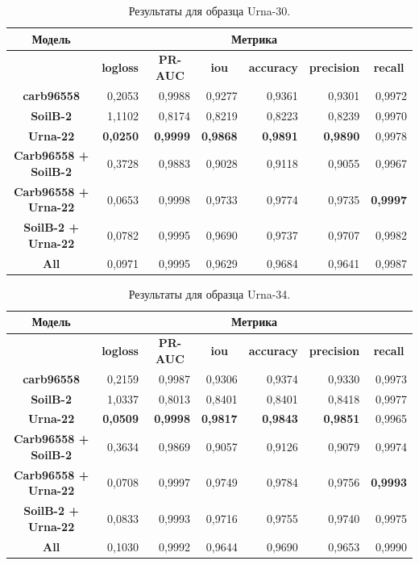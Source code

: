 \documentclass[12pt, a4paper]{extarticle}
\begin{document}
\begin{table}[htbp]
\small
\begin{tabular}{|c|r|r|r|r|r|r|}
\hline
\textbf{Модель} & \multicolumn{ 6}{c|}{\textbf{Метрика}} \\ \hline
\textbf{} & \multicolumn{1}{c|}{\textbf{logloss}} & \multicolumn{1}{c|}{\textbf{PR-AUC}} & \multicolumn{1}{c|}{\textbf{iou}} & \multicolumn{1}{c|}{\textbf{accuracy}} & \multicolumn{1}{c|}{\textbf{precision}} & \multicolumn{1}{c|}{\textbf{recall}} \\ \hline
\textbf{carb96558} & 0,2053 & 0,9988 & 0,9277 & 0,9361 & 0,9301 & 0,9972 \\ \hline
\textbf{SoilB-2} & 1,1102 & 0,8174 & 0,8219 & 0,8223 & 0,8239 & 0,9970 \\ \hline
\textbf{Urna-22} & \textbf{0,0250} & \textbf{0,9999} & \textbf{0,9868} & \textbf{0,9891} & \textbf{0,9890} & 0,9978 \\ \hline
\textbf{Carb96558 + SoilB-2} & 0,3728 & 0,9883 & 0,9028 & 0,9118 & 0,9055 & 0,9967 \\ \hline
\textbf{Carb96558 + Urna-22} & 0,0653 & 0,9998 & 0,9733 & 0,9774 & 0,9735 & \textbf{0,9997} \\ \hline
\textbf{SoilB-2 + Urna-22} & 0,0782 & 0,9995 & 0,9690 & 0,9737 & 0,9707 & 0,9982 \\ \hline
\textbf{All} & 0,0971 & 0,9995 & 0,9629 & 0,9684 & 0,9641 & 0,9987 \\ \hline
\end{tabular}
\caption{Результаты для образца Urna-30.}
\label{Urna_30}
\end{table}


\begin{table}[htbp]
\small
\begin{tabular}{|c|r|r|r|r|r|r|}
\hline
\textbf{Модель} & \multicolumn{ 6}{c|}{\textbf{Метрика}} \\ \hline
\textbf{} & \multicolumn{1}{c|}{\textbf{logloss}} & \multicolumn{1}{c|}{\textbf{PR-AUC}} & \multicolumn{1}{c|}{\textbf{iou}} & \multicolumn{1}{c|}{\textbf{accuracy}} & \multicolumn{1}{c|}{\textbf{precision}} & \multicolumn{1}{c|}{\textbf{recall}} \\ \hline
\textbf{carb96558} & 0,2159 & 0,9987 & 0,9306 & 0,9374 & 0,9330 & 0,9973 \\ \hline
\textbf{SoilB-2} & 1,0337 & 0,8013 & 0,8401 & 0,8401 & 0,8418 & 0,9977 \\ \hline
\textbf{Urna-22} & \textbf{0,0509} & \textbf{0,9998} & \textbf{0,9817} & \textbf{0,9843} & \textbf{0,9851} & 0,9965 \\ \hline
\textbf{Carb96558 + SoilB-2} & 0,3634 & 0,9869 & 0,9057 & 0,9126 & 0,9079 & 0,9974 \\ \hline
\textbf{Carb96558 + Urna-22} & 0,0708 & 0,9997 & 0,9749 & 0,9784 & 0,9756 & \textbf{0,9993} \\ \hline
\textbf{SoilB-2 + Urna-22} & 0,0833 & 0,9993 & 0,9716 & 0,9755 & 0,9740 & 0,9975 \\ \hline
\textbf{All} & 0,1030 & 0,9992 & 0,9644 & 0,9690 & 0,9653 & 0,9990 \\ \hline
\end{tabular}
\caption{Результаты для образца Urna-34.}
\label{Urna_34}
\end{table}
\end{document}
